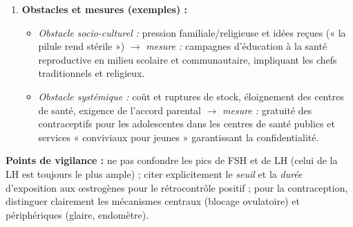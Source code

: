 \documentclass[11pt]{article}
\begin{document}
\begin{corrige}
\begin{enumerate}
    \begin{itemize}
        \item blocage de l'\textbf{ovulation} par rétrocontrôle négatif continu du progestatif sur l'axe hypothalamo-hypophysaire (suppression du pic de LH) ;
        \item épaississement de la \textbf{glaire cervicale}, devenant imperméable au passage des spermatozoïdes ;
        \item atrophie de l'\textbf{endomètre}, le rendant impropre à la nidation ;
        \item (bonus) ralentissement de la \textbf{mobilité tubaire}, perturbant le transport des gamètes.
    \end{itemize}
    \item \textbf{Obstacles et mesures (exemples) :}
    \begin{itemize}
        \item \emph{Obstacle socio-culturel :} pression familiale/religieuse et idées reçues (« la pilule rend stérile ») $\rightarrow$ \emph{mesure :} campagnes d'éducation à la santé reproductive en milieu scolaire et communautaire, impliquant les chefs traditionnels et religieux.
        \item \emph{Obstacle systémique :} coût et ruptures de stock, éloignement des centres de santé, exigence de l'accord parental $\rightarrow$ \emph{mesure :} gratuité des contraceptifs pour les adolescentes dans les centres de santé publics et services « conviviaux pour jeunes » garantissant la confidentialité.
    \end{itemize}
\end{enumerate}
\textbf{Points de vigilance :} ne pas confondre les pics de FSH et de LH (celui de la LH est toujours le plus ample) ; citer explicitement le \emph{seuil} et la \emph{durée} d'exposition aux œstrogènes pour le rétrocontrôle positif ; pour la contraception, distinguer clairement les mécanismes centraux (blocage ovulatoire) et périphériques (glaire, endomètre).
\end{corrige}
\end{document}
